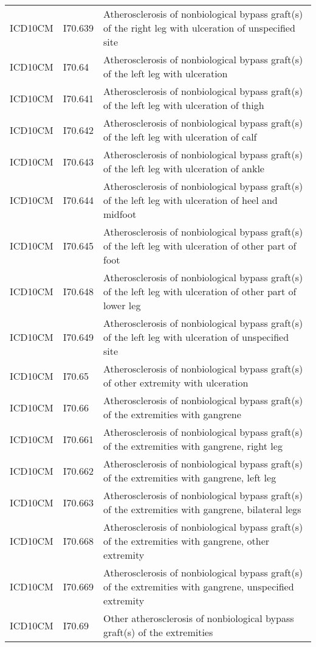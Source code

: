 \begin{longtable}{p{}p{}p{}}
  ICD10CM & I70.639 & Atherosclerosis of nonbiological bypass graft(s) of the right leg with ulceration of unspecified site \\ 
  ICD10CM & I70.64 & Atherosclerosis of nonbiological bypass graft(s) of the left leg with ulceration \\ 
  ICD10CM & I70.641 & Atherosclerosis of nonbiological bypass graft(s) of the left leg with ulceration of thigh \\ 
  ICD10CM & I70.642 & Atherosclerosis of nonbiological bypass graft(s) of the left leg with ulceration of calf \\ 
  ICD10CM & I70.643 & Atherosclerosis of nonbiological bypass graft(s) of the left leg with ulceration of ankle \\ 
  ICD10CM & I70.644 & Atherosclerosis of nonbiological bypass graft(s) of the left leg with ulceration of heel and midfoot \\ 
  ICD10CM & I70.645 & Atherosclerosis of nonbiological bypass graft(s) of the left leg with ulceration of other part of foot \\ 
  ICD10CM & I70.648 & Atherosclerosis of nonbiological bypass graft(s) of the left leg with ulceration of other part of lower leg \\ 
  ICD10CM & I70.649 & Atherosclerosis of nonbiological bypass graft(s) of the left leg with ulceration of unspecified site \\ 
  ICD10CM & I70.65 & Atherosclerosis of nonbiological bypass graft(s) of other extremity with ulceration \\ 
  ICD10CM & I70.66 & Atherosclerosis of nonbiological bypass graft(s) of the extremities with gangrene \\ 
  ICD10CM & I70.661 & Atherosclerosis of nonbiological bypass graft(s) of the extremities with gangrene, right leg \\ 
  ICD10CM & I70.662 & Atherosclerosis of nonbiological bypass graft(s) of the extremities with gangrene, left leg \\ 
  ICD10CM & I70.663 & Atherosclerosis of nonbiological bypass graft(s) of the extremities with gangrene, bilateral legs \\ 
  ICD10CM & I70.668 & Atherosclerosis of nonbiological bypass graft(s) of the extremities with gangrene, other extremity \\ 
  ICD10CM & I70.669 & Atherosclerosis of nonbiological bypass graft(s) of the extremities with gangrene, unspecified extremity \\ 
  ICD10CM & I70.69 & Other atherosclerosis of nonbiological bypass graft(s) of the extremities \\ 

\end{longtable}

